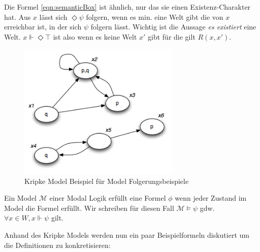 Die Formel \eqref{eqn:semanticBox} ist ähnlich, nur das sie einen Existenz-Charakter hat. 
Aus $x$ lässt sich $\Diamond \psi$ folgern, wenn es min. eine Welt gibt die von $x$ erreichbar ist, in der sich $\psi$ folgern lässt. 
Wichtig ist die Aussage \emph{es existiert} eine Welt. 
$x \Vdash \Diamond \top$ ist also \false wenn es keine Welt $x'$ gibt für die gilt $R(x,x')$.\\


\begin{figure}
	\centering
	\includegraphics[height=6.5cm]{Images/Kripke01.png}
	\caption{Kripke Model Beispiel für Model Folgerungsbeispiele}
	\label{fig:Kripke01}
\end{figure}


\begin{definition}
	\label{def:model_erfuellt}
	Ein Model $\mathcal{M}$ einer Modal Logik erfüllt eine Formel $\phi$ wenn jeder Zustand im Model die Formel erfüllt.
	Wir schreiben für diesen Fall $\mathcal{M} \vDash \psi$ gdw. $\forall x \in W, x \Vdash \psi$ gilt.
\end{definition}
\cite[S.310f]{huth2004logic}
%
Anhand des Kripke Models  werden nun ein paar Beispielformeln diskutiert um die Definitionen zu konkretisieren:

